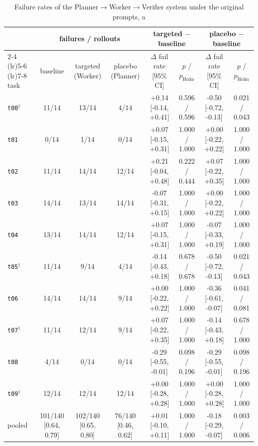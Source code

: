 \begin{table}[t]
\centering\scriptsize
\begin{tabular}{lccccccc}
\toprule
 & \multicolumn{3}{c}{failures / rollouts} & \multicolumn{2}{c}{targeted $-$ baseline} & \multicolumn{2}{c}{placebo $-$ baseline} \\
\cmidrule(lr){2-4} \cmidrule(lr){5-6} \cmidrule(lr){7-8}
task & baseline & targeted (Worker) & placebo (Planner) & $\Delta$ fail rate [95\% CI] & $p$ / $p_{\mathrm{Holm}}$ & $\Delta$ fail rate [95\% CI] & $p$ / $p_{\mathrm{Holm}}$ \\
\midrule
\texttt{t00}$^\dagger$ & 11/14 & 13/14 & 4/14 & +0.14 [-0.14, +0.41] & 0.596 / 0.596 & -0.50 [-0.72, -0.13] & 0.021 / 0.043 \\
\texttt{t01} & 0/14 & 1/14 & 0/14 & +0.07 [-0.15, +0.31] & 1.000 / 1.000 & +0.00 [-0.22, +0.22] & 1.000 / 1.000 \\
\texttt{t02} & 11/14 & 14/14 & 12/14 & +0.21 [-0.04, +0.48] & 0.222 / 0.444 & +0.07 [-0.22, +0.35] & 1.000 / 1.000 \\
\texttt{t03} & 14/14 & 13/14 & 14/14 & -0.07 [-0.31, +0.15] & 1.000 / 1.000 & +0.00 [-0.22, +0.22] & 1.000 / 1.000 \\
\texttt{t04} & 13/14 & 14/14 & 12/14 & +0.07 [-0.15, +0.31] & 1.000 / 1.000 & -0.07 [-0.33, +0.19] & 1.000 / 1.000 \\
\texttt{t05}$^\dagger$ & 11/14 & 9/14 & 4/14 & -0.14 [-0.43, +0.18] & 0.678 / 0.678 & -0.50 [-0.72, -0.13] & 0.021 / 0.043 \\
\texttt{t06} & 14/14 & 14/14 & 9/14 & +0.00 [-0.22, +0.22] & 1.000 / 1.000 & -0.36 [-0.61, -0.07] & 0.041 / 0.081 \\
\texttt{t07}$^\dagger$ & 11/14 & 12/14 & 9/14 & +0.07 [-0.22, +0.35] & 1.000 / 1.000 & -0.14 [-0.43, +0.18] & 0.678 / 1.000 \\
\texttt{t08} & 4/14 & 0/14 & 0/14 & -0.29 [-0.55, -0.01] & 0.098 / 0.196 & -0.29 [-0.55, -0.01] & 0.098 / 0.196 \\
\texttt{t09}$^\dagger$ & 12/14 & 12/14 & 12/14 & +0.00 [-0.28, +0.28] & 1.000 / 1.000 & +0.00 [-0.28, +0.28] & 1.000 / 1.000 \\
\midrule
pooled & 101/140 [0.64, 0.79] & 102/140 [0.65, 0.80] & 76/140 [0.46, 0.62] & +0.01 [-0.10, +0.11] & 1.000 / 1.000 & -0.18 [-0.29, -0.07] & 0.003 / 0.006 \\
\bottomrule
\end{tabular}
\caption{Failure rates of the Planner$\to$Worker$\to$Verifier system under the original prompts, a
}
\end{table}
